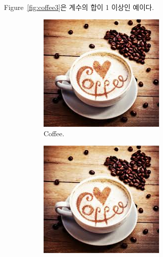\documentclass{article}
\begin{document}
	Figure~\ref{fig:coffee3}은 계수의 합이 1 이상인 예이다.
	
	\begin{figure}[h!]
  		\centering
  		\begin{subfigure}[b]{0.2\linewidth}
    		\includegraphics[width=\linewidth]{coffee.jpg}
     		\caption{Coffee.}
  		\end{subfigure}
  		\begin{subfigure}[b]{0.2\linewidth}
    		\includegraphics[width=\linewidth]{coffee.jpg}

\end{subfigure}
\end{figure}
\end{document}

